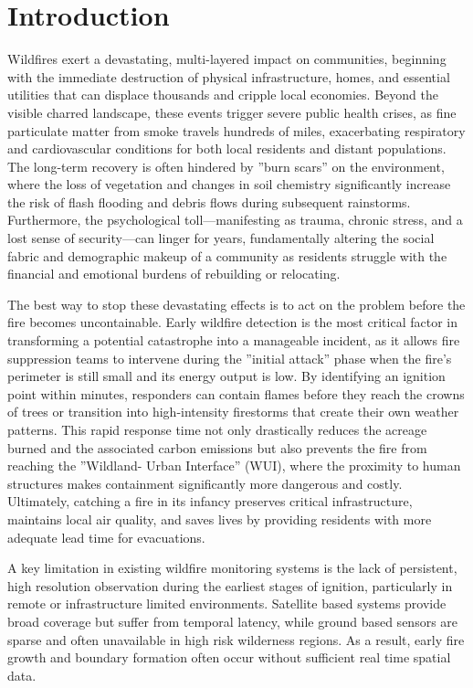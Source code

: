 \documentclass[journal, onecolumn]{IEEEtran}
\begin{document}
\section{Introduction}
Wildfires exert a devastating, multi-layered impact on communities, beginning with the immediate destruction of physical
infrastructure, homes, and essential utilities that can displace thousands and cripple local economies. Beyond the visible
charred landscape, these events trigger severe public health crises, as fine particulate matter from smoke travels hundreds of
miles, exacerbating respiratory and cardiovascular conditions for both local residents and distant populations. The long-term
recovery is often hindered by ”burn scars” on the environment, where the loss of vegetation and changes in soil chemistry
significantly increase the risk of flash flooding and debris flows during subsequent rainstorms. Furthermore, the psychological
toll—manifesting as trauma, chronic stress, and a lost sense of security—can linger for years, fundamentally altering the social
fabric and demographic makeup of a community as residents struggle with the financial and emotional burdens of rebuilding
or relocating.

The best way to stop these devastating effects is to act on the problem before the fire becomes uncontainable. Early
wildfire detection is the most critical factor in transforming a potential catastrophe into a manageable incident, as it allows fire
suppression teams to intervene during the ”initial attack” phase when the fire’s perimeter is still small and its energy output
is low. By identifying an ignition point within minutes, responders can contain flames before they reach the crowns of trees
or transition into high-intensity firestorms that create their own weather patterns. This rapid response time not only drastically
reduces the acreage burned and the associated carbon emissions but also prevents the fire from reaching the ”Wildland-
Urban Interface” (WUI), where the proximity to human structures makes containment significantly more dangerous and costly.
Ultimately, catching a fire in its infancy preserves critical infrastructure, maintains local air quality, and saves lives by providing
residents with more adequate lead time for evacuations.

A key limitation in existing wildfire monitoring systems is the lack of persistent, high resolution observation during the
earliest stages of ignition, particularly in remote or infrastructure limited environments. Satellite based systems provide broad
coverage but suffer from temporal latency, while ground based sensors are sparse and often unavailable in high risk wilderness
regions. As a result, early fire growth and boundary formation often occur without sufficient real time spatial data.
\end{document}
